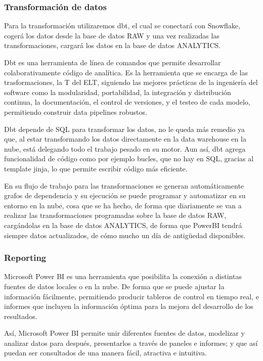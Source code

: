 \subsubsection{Transformación de datos}

Para la transformación utilizaremos dbt, el cual se conectará con Snowflake, cogerá los datos desde la base de datos RAW y una vez realizadas las transformaciones, cargará los datos en la base de datos ANALYTICS.

Dbt \cite{dbt} es una herramienta de línea de comandos que permite desarrollar colaborativamente código de analítica. Es la herramienta que se encarga de las trasformaciones, la T del ELT, siguiendo las mejores prácticas de la ingeniería del software como la modularidad, portabilidad, la integración y distribución continua, la documentación, el control de versiones, y el testeo de cada modelo, permitiendo construir data pipelines robustos.

Dbt depende de SQL para transformar los datos, no le queda más remedio ya que, al estar transformando los datos directamente en la data warehouse en la nube, está delegando todo el trabajo pesado en su motor. Aun así, dbt agrega funcionalidad de código como por ejemplo bucles, que no hay en SQL, gracias al template jinja, lo que permite escribir código más eficiente.

En su flujo de trabajo para las transformaciones se generan automáticamente grafos de dependencia y su ejecución se puede programar y automatizar en su entorno en la nube, cosa que se ha hecho, de forma que diariamente se van a realizar las transformaciones programadas sobre la base de datos RAW, cargándolas en la base de datos ANALYTICS, de forma que PowerBI tendrá siempre datos actualizados, de cómo mucho un día de antigüedad disponibles.

\subsubsection{Reporting}

Microsoft Power BI\cite{MPBI} es una herramienta que posibilita la conexión a distintas fuentes de datos locales o en la nube. De forma que se puede ajustar la información fácilmente, permitiendo producir tableros de control en tiempo real, e informes que incluyen la información óptima para la mejora del desarrollo de los resultados.
	
Así, Microsoft Power BI permite unir diferentes fuentes de datos, modelizar y analizar datos para después, presentarlos a través de paneles e informes; y que así puedan ser consultados de una manera fácil, atractiva e intuitiva.
	
